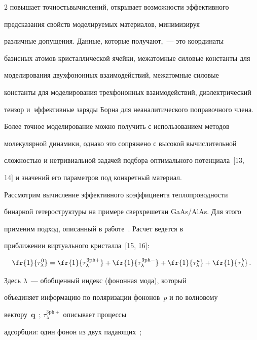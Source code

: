 \begin{multicols}{2}
повышает точность\linebreak вычислений, открывает возможности эффективного 


пред\-ска\-за\-ния свойств моделируемых {материалов}, минимизируя 


различные допущения. \mbox{Данные}, которые получают,~--- это координаты 


базисных атомов кристаллической ячейки, межатомные силовые константы для 


моделирования двухфононных взаимодействий, межатомные силовые 


константы для моделирования трехфононных \mbox{взаимодействий}, диэлектрический 


тензор и~эффективные заряды Борна для неаналитического поправочного члена.


    


    Более точное моделирование можно получить с использованием методов 


молекулярной динамики, однако это сопряжено с высокой вычислительной 


сложностью и нетривиальной задачей подбора оптимального потенциала~[13, 


14] и значений его параметров под конкретный материал. 


    


    Рассмотрим вычисление эффективного коэффициента теплопроводности 


бинарной гетероструктуры на примере сверхрешетки GaAs/AlAs. Для этого 


применим подход, описанный в работе~\cite{8-ab}. Расчет ведется в 


приближении виртуального кристалла~[15, 16]: 


    $$


    \fr{1}{\tau^0_\lambda}=\fr{1}{\tau_\lambda^{3\mathrm{ph}+}}+\fr{1} 


{\tau_\lambda^{3\mathrm{ph}-}}+\fr{1}{\tau^a_\lambda} +\fr{1}{\tau^b_\lambda}\,.


    $$


    Здесь $\lambda$~--- обобщенный индекс (фононная мода), который 


объединяет информацию по поляризации фононов~$p$ и по волновому 


вектору~$\mathbf{q}$~\cite{16-ab}; $\tau_\lambda^{3\mathrm{ph}+}$ описывает процессы 


адсорбции: один фонон из двух падающих~\cite{15-ab, 16-ab}; 



\end{multicols}
